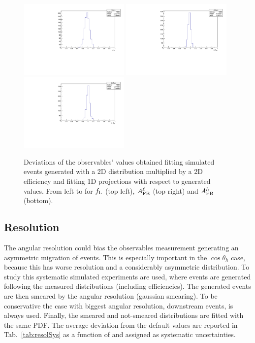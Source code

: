 \begin{figure}
\centering
\includegraphics[width=0.48\textwidth]{Lmumu/figs/fLsys_efficiency.pdf}
\includegraphics[width=0.48\textwidth]{Lmumu/figs/afbsys_efficiency.pdf}
\includegraphics[width=0.48\textwidth]{Lmumu/figs/afbBsys_efficiency.pdf}
\caption{Deviations of the observables' values obtained fitting simulated events
 generated with a 2D distribution multiplied by a 2D efficiency and fitting 1D projections
 with respect to generated values. From left to for $f_{\rm L}$ (top left), 
 $A_{\rm FB}^\ell$ (top right) and $A_{\rm FB}^h$ (bottom). }
\label{fig:effBias}
\end{figure}




\subsection{Resolution}

The angular resolution could bias the observables measurement 
generating an asymmetric migration of events.
This is especially important in the $\cos \theta_h$ case, because this has worse resolution
and a considerably asymmetric distribution. To study this systematic simulated experiments are used,
where events are generated following the measured distributions (including efficiencies).
The generated events are then smeared by the angular resolution (gaussian smearing).
To be conservative the case with biggest angular resolution, downstream events, is always used.
Finally, the smeared and not-smeared distributions are fitted with the same PDF.  
The average deviation from the default values are reported in Tab.~\ref{tab:resolSys}
as a function of \qsq and assigned as systematic uncertainties.

